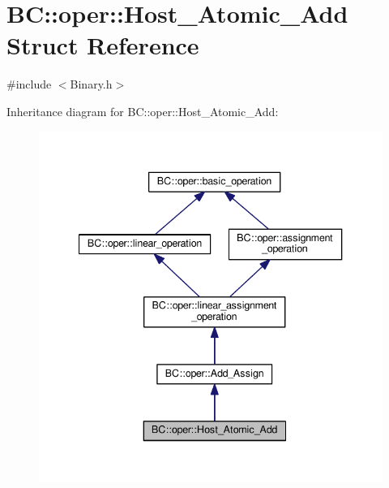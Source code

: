 \hypertarget{structBC_1_1oper_1_1Host__Atomic__Add}{}\section{BC\+:\+:oper\+:\+:Host\+\_\+\+Atomic\+\_\+\+Add Struct Reference}
\label{structBC_1_1oper_1_1Host__Atomic__Add}


{\ttfamily \#include $<$Binary.\+h$>$}



Inheritance diagram for BC\+:\+:oper\+:\+:Host\+\_\+\+Atomic\+\_\+\+Add\+:
\nopagebreak
\begin{figure}[H]
\begin{center}
\leavevmode
\includegraphics[width=340pt]{structBC_1_1oper_1_1Host__Atomic__Add__inherit__graph}
\end{center}
\end{figure}


